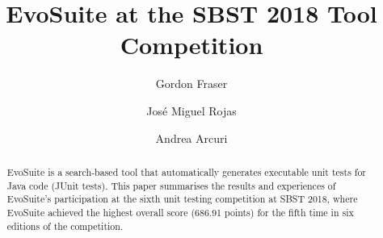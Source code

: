 \documentclass[sigconf,table]{acmart}
\newcommand{\EVOSUITE}{{\sc EvoSuite}\xspace}
\newcommand{\TOTALPOINTS}{{686.91}\xspace}
\begin{document}
% 

\title{\EVOSUITE at the SBST 2018 Tool Competition}
 

\author{Gordon Fraser}

\author{Jos\'e Miguel Rojas}

\author{Andrea Arcuri}


\renewcommand{\shortauthors}{B. Trovato et al.}


\begin{abstract}
  \EVOSUITE is a search-based tool that automatically generates
  executable unit tests for Java code (JUnit tests).  This paper
  summarises the results and experiences of \EVOSUITE's participation
  at the sixth unit testing competition at SBST 2018, where \EVOSUITE
  achieved the highest overall score (\TOTALPOINTS points) for the
  fifth time in six editions of the competition.
\end{abstract}

\maketitle

\end{document}

